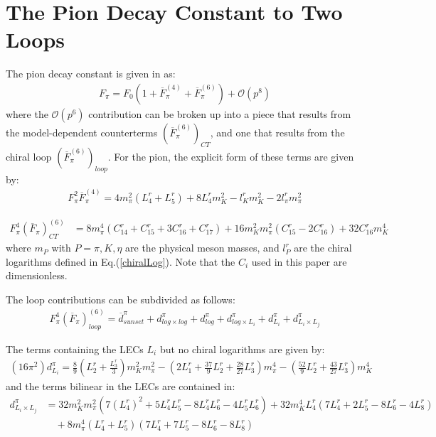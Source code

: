 \documentclass[12pt,a4paper]{article}
\begin{document}
\section{The Pion Decay Constant to Two Loops \label{SecPionDecay}}

The pion decay constant is given in \cite{Amoros:1999dp} as:
\begin{align}
	F_{\pi}=F_0(1+\overline{F}_{\pi}^{(4)}+\overline{F}_{\pi}^{(6)}) + \mathcal{O}(p^8)
\end{align}
where the $\mathcal{O}(p^6)$ contribution can be broken up into a piece that results from the model-dependent counterterms $(\overline{F}_{\pi}^{(6)})_{CT}$, and one that results from the chiral loop $(\overline{F}_{\pi}^{(6)})_{loop}$. For the pion, the explicit form of these terms are given by:
\begin{align}
F_{\pi}^2 \overline{F}_{\pi}^{(4)} = 4 m_{\pi}^2 (L^r_{4}+L^r_{5})+8 L^r_{4} m_{K}^2-l^r_{K} m_{K}^2-2 l^r_{\pi} m_{\pi}^2
\end{align}

\begin{align}
	F_{\pi}^4 (\overline{F}_{\pi})^{(6)}_{CT} &= 8 m_{\pi}^4 (C^r_{14}+C^r_{15}+3 C^r_{16}+C^r_{17})+16 m_{K}^2 m_{\pi}^2 (C^r_{15}-2 C^r_{16})+32 C^r_{16} m_{K}^4
\end{align}
where $m_{P}$ with $P=\pi,K,\eta$ are the physical meson masses, and $l_{P}^{r}$ are the chiral logarithms defined in Eq.(\ref{chiralLog}). Note that the $C_i$ used in this paper are dimensionless.

The loop contributions can be subdivided as follows: 
\begin{align}
	F_{\pi}^4 (\overline{F}_{\pi})^{(6)}_{loop} = \overline{d}^{\pi}_{sunset} + d^{\pi}_{log \times log} + d^{\pi}_{log} + d^{\pi}_{log \times L_i} + d^{\pi}_{L_i} + d^{\pi}_{L_i \times L_j} \label{dloop}
\end{align}

The terms containing the LECs $L_i$ but no chiral logarithms are given by:
\begin{align}
	(16 \pi^2) d^{\pi}_{L_i} = \frac{8}{9} \left(L^r_{2}+\frac{L^r_{3}}{3}\right) m_{K}^2 m_{\pi}^2 - \left(2 L^r_{1}+\frac{37}{9} L^r_{2} + \frac{28}{27} L^r_{3} \right) m_{\pi}^4 - \left( \frac{52}{9} L^r_{2}+\frac{43}{27} L^r_{3} \right) m_{K}^4
\end{align}
and the terms bilinear in the LECs are contained in:
\begin{align}
	d^{\pi}_{L_i \times L_j} &= 32 m_{K}^2 m_{\pi}^2 \left(7 (L^r_{4})^2+5 L^r_{4} L^r_{5}-8 L^r_{4} L^r_{6}-4 L^r_{5} L^r_{6}\right)+32 m_{K}^4 L^r_{4} (7 L^r_{4}+2 L^r_{5}-8 L^r_{6}-4 L^r_{8}) \nonumber \\
	& \quad +8 m_{\pi}^4 (L^r_{4}+L^r_{5}) (7 L^r_{4}+7 L^r_{5}-8 L^r_{6}-8 L^r_{8})
\end{align}
\end{document}
